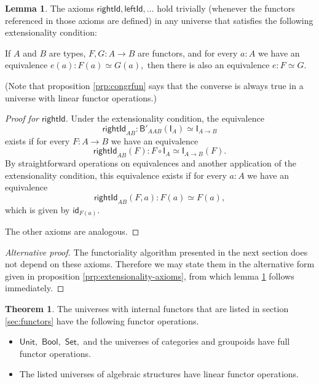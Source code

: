 \documentclass[a4paper]{article}
\theoremstyle{definition}
\newtheorem{theorem}[definition]{Theorem}
\newtheorem{lemma}[definition]{Lemma}
\theoremstyle{remark}
\renewcommand{\equiv}{\simeq}
\newcommand{\nm}{\mathsf}
\newcommand{\universe}{\nm}
\newcommand{\Unit}{\universe{Unit}}
\newcommand{\Bool}{\universe{Bool}}
\newcommand{\Set}{\universe{Set}}
\newcommand{\id}{\nm{id}}
\newcommand{\combinator}{\nm}
\newcommand{\idFun}{\combinator{I}}
\newcommand{\compFun}{\combinator{B'}}
\begin{document}
\begin{lemma}
  \label{lem:extensional}
  The axioms $\nm{rightId},\nm{leftId},\ldots$ hold trivially (whenever the functors
  referenced in those axioms are defined) in any universe that satisfies the following
  extensionality condition:

  If $A$ and $B$ are types, $F,G : A \to B$ are functors, and for every $a : A$ we have
  an equivalence $e(a) : F(a) \equiv G(a),$ then there is also an equivalence
  $e : F \equiv G.$
\end{lemma}

(Note that proposition \ref{prp:congrfun} says that the converse is always true in
a universe with linear functor operations.)

\begin{proof}[Proof for $\nm{rightId}$]
  Under the extensionality condition, the equivalence
  \[\nm{rightId}_{AB} : \compFun_{AAB}(\idFun_A) \equiv \idFun_{A{\to}B}\]
  exists if for every $F : A \to B$ we have an equivalence
  \[\nm{rightId}_{AB}(F) : F \circ \idFun_A \equiv \idFun_{A{\to}B}(F).\]
  By straightforward operations on equivalences and another application of the
  extensionality condition, this equivalence exists if for every $a : A$ we have an
  equivalence
  \[\nm{rightId}_{AB}(F,a) : F(a) \equiv F(a),\]
  which is given by $\id_{F(a)}.$

  The other axioms are analogous.
\end{proof}

\begin{proof}[Alternative proof]
  The functoriality algorithm presented in the next section does not depend on these
  axioms. Therefore we may state them in the alternative form given in proposition
  \ref{prp:extensionality-axioms}, from which lemma \ref{lem:extensional} follows
  immediately.
\end{proof}

\begin{theorem}
  \label{thm:funop}
  The universes with internal functors that are listed in section \ref{sec:functors} have the
  following functor operations.
  \begin{itemize}
    \item $\Unit,$ $\Bool,$ $\Set,$ and the universes of categories and groupoids have
    full functor operations.
    \item The listed universes of algebraic structures have linear functor operations.
  \end{itemize}
\end{theorem}
\end{document}
